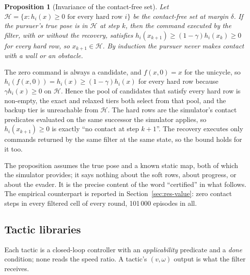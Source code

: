 \documentclass[conference]{IEEEtran}
\newtheorem{proposition}{Proposition}
\begin{document}
\begin{proposition}[Invariance of the contact-free set]
\label{prop:safe}
Let $\mathcal{H}=\{x : h_i(x)\ge 0 \text{ for every hard row } i\}$ be the contact-free set at margin $\delta$. If the pursuer's true pose is in $\mathcal{H}$ at step $k$, then the command executed by the filter, with or without the recovery, satisfies $h_i(x_{k+1})\ge(1-\gamma)h_i(x_k)\ge 0$ for every hard row, so $x_{k+1}\in\mathcal{H}$. By induction the pursuer never makes contact with a wall or an obstacle.
\end{proposition}
\begin{IEEEproof}
The zero command is always a candidate, and $f(x,0)=x$ for the unicycle, so $h_i(f(x,0))=h_i(x)\ge(1-\gamma)h_i(x)$ for every hard row because $\gamma h_i(x)\ge 0$ on $\mathcal{H}$. Hence the pool of candidates that satisfy every hard row is non-empty, the exact and relaxed tiers both select from that pool, and the backup tier is unreachable from $\mathcal{H}$. The hard rows are the simulator's contact predicates evaluated on the same successor the simulator applies, so $h_i(x_{k+1})\ge 0$ is exactly ``no contact at step $k+1$''. The recovery executes only commands returned by the same filter at the same state, so the bound holds for it too.
\end{IEEEproof}
The proposition assumes the true pose and a known static map, both of which the simulator provides; it says nothing about the soft rows, about progress, or about the evader. It is the precise content of the word ``certified'' in what follows. The empirical counterpart is reported in Section~\ref{sec:res-value}: zero contact steps in every filtered cell of every round, 101\,000 episodes in all.

\subsection{Tactic libraries}
\label{sec:tactics}
Each tactic is a closed-loop controller with an \emph{applicability} predicate and a \emph{done} condition; none reads the speed ratio. A tactic's $(v,\omega)$ output is what the filter receives.
\end{document}

